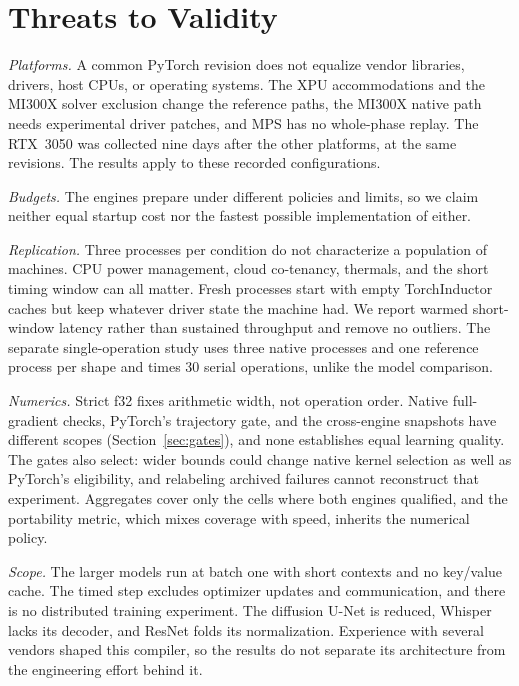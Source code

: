 \documentclass[conference]{IEEEtran}
\begin{document}
\section{Threats to Validity}

\emph{Platforms.} A common PyTorch revision does not equalize vendor
libraries, drivers, host CPUs, or operating systems. The XPU accommodations
and the MI300X solver exclusion change the reference paths, the MI300X
native path needs experimental driver patches, and MPS has no whole-phase
replay. The RTX~3050 was collected nine days after the other platforms, at
the same revisions. The results apply to these recorded configurations.

\emph{Budgets.} The engines prepare under different policies and limits, so
we claim neither equal startup cost nor the fastest possible implementation
of either.

\emph{Replication.} Three processes per condition do not characterize a
population of machines. CPU power management, cloud co-tenancy, thermals,
and the short timing window can all matter. Fresh processes start with empty
TorchInductor caches but keep whatever driver state the machine had. We
report warmed short-window latency rather than sustained throughput and
remove no outliers. The separate single-operation study uses three native processes and one
reference process per shape and times 30 serial operations, unlike the
model comparison.

\emph{Numerics.} Strict f32 fixes arithmetic width, not operation order.
Native full-gradient checks, PyTorch's trajectory gate, and the cross-engine
snapshots have different scopes (Section~\ref{sec:gates}), and none
establishes equal learning quality. The gates also select: wider bounds could
change native kernel selection as well as PyTorch's eligibility, and
relabeling archived failures cannot reconstruct that experiment. Aggregates
cover only the cells where both engines qualified, and the portability
metric, which mixes coverage with speed, inherits the numerical policy.

\emph{Scope.} The larger models run at batch one with short contexts and no
key/value cache. The timed step excludes optimizer updates and communication,
and there is no distributed training experiment. The diffusion U-Net is
reduced, Whisper lacks its decoder, and ResNet folds its normalization.
Experience with several vendors shaped this compiler, so the results do not
separate its architecture from the engineering effort behind it.
\end{document}
